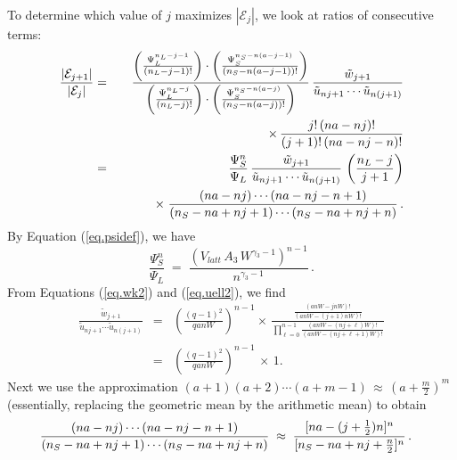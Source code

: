 \documentclass[journal=mamobx,manuscript=article]{achemso}
\begin{document}
To determine which value of $j$ maximizes $|\mathcal{E}_j|$, we look at ratios of consecutive terms:
\begin{eqnarray}
    \frac{|\mathcal{E}_{j+1}|}{|\mathcal{E}_j|}   & = & 
 \frac{
     \left(\frac{\Psi_L^{n_{L}-j-1}}{(n_L-j-1)!}\right)\cdot\left(\frac{\Psi_S^{n_S-n(a-j-1)}}{
    (n_S-n(a-j-1))!}\right) 
      }{
 \left(\frac{\Psi_L^{n_{L}-j}}{(n_L-j)!}\right)\cdot\left(\frac{\Psi_S^{n_S-n(a-j)}}{
    (n_S-n(a-j))!}\right)  }  \,   \frac{\tilde{w}_{j+1} }{  \tilde{u}_{nj+1}\cdots \tilde{u}_{n(j+1)} } 
    \nonumber \\
    & & \hspace{42mm}  
     \times   \, \frac{ j! \, (na-nj)!}{(j+1)!\, (na-nj-n)!}  
    \nonumber    \\
    & = & \frac{\Psi_S^n}{\Psi_L}
    \,   \frac{\tilde{w}_{j+1} }{  \tilde{u}_{nj+1}\cdots \tilde{u}_{n(j+1)} }   \,\left(  \frac{n_L-j}{j+1}\right)
    \nonumber \\
    & &   \hspace{8mm}  \times \;  \frac{(na-nj)\cdots (na-nj-n+1)}{(n_S-na+nj+1)\cdots(n_S-na+nj+n)} \,.
        \label{eq.Yratio1}
\end{eqnarray}
By Equation (\ref{eq.psidef}), we have
\begin{equation}
   \label{eq.psiratio} 
      \frac{\Psi_S^n}{\Psi_L}   \;=\;   \frac{ (V_{latt}\, A_3 \,W^{\gamma_3-1})^{n-1}}{n^{\gamma_3-1}}\,.
\end{equation}
From Equations (\ref{eq.wk2}) and (\ref{eq.uell2}), we find
\begin{eqnarray}
     \frac{\tilde{w}_{j+1} }{  \tilde{u}_{nj+1}\cdots \tilde{u}_{n(j+1)} }  & = & 
        \left( \frac{(q-1)^2}{qanW}\right)^{n-1}   \times \,
    \frac{   \frac{(anW-jnW)!}{(anW-(j+1)nW)!}  }{
        \prod_{\ell=0}^{n-1} \frac{ (anW-(nj+\ell)W)!}{(anW-(nj+\ell+1)W)!}   }
     \nonumber  \\
     & = & \left( \frac{(q-1)^2}{qanW}\right)^{n-1}  \,\times\, 1.
     \label{eq.Yratioa}     
\end{eqnarray}
Next we use the approximation   $(a+1)(a+2)\cdots (a+m-1) \,\approx \,(a+\frac{m}{2})^m$
(essentially, replacing the geometric mean by the arithmetic mean) to obtain
\begin{equation}
       \frac{(na-nj)\cdots (na-nj-n+1)}{(n_S-na+nj+1)\cdots(n_S-na+nj+n)} 
       \; \approx \;    \frac{ [na-(j+\frac{1}{2})n]^n }{ [n_S-na+nj+\frac{n}{2}]^n} \,.\hspace{3mm}
      \label{eq.Yratiob}
\end{equation} 
\end{document}
